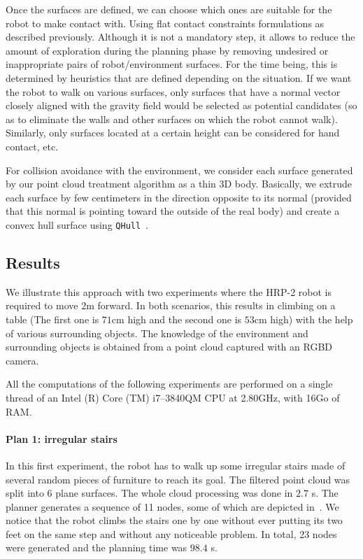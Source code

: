 Once the surfaces are defined, we can choose which ones are suitable for the robot to make contact with.
Using flat contact constraints formulations as described previously.
Although it is not a mandatory step, it allows to reduce the amount of exploration during the planning phase by removing undesired or inappropriate pairs of robot/environment surfaces.
For the time being, this is determined by heuristics that are defined depending on the situation.
If we want the robot to walk on various surfaces, only surfaces that have a normal vector closely aligned with the gravity field would be selected as potential candidates (so as to eliminate the walls and other surfaces on which the robot cannot walk).
Similarly, only surfaces located at a certain height can be considered for hand contact, etc.

For collision avoidance with the environment, we consider each surface generated by our point cloud treatment algorithm as a thin 3D body.
Basically, we extrude each surface by few centimeters in the direction opposite to its normal (provided that this normal is pointing toward the outside of the real body) and create a convex hull surface using {\tt QHull}~\cite{qhull:acm:1996}.

\subsection{Results}
\label{sub:results_pcl_plannif}

We illustrate this approach with two experiments where the HRP-2 robot is required to move $2$m forward.
In both scenarios, this results in climbing on a table (The first one is $71$cm high and the second one is $53$cm high) with the help of various surrounding objects.
The knowledge of the environment and surrounding objects is obtained from a point cloud captured with an RGBD camera.

All the computations of the following experiments are performed on a single thread of an Intel (R) Core (TM) i7--3840QM CPU at 2.80GHz, with 16Go of RAM\@.

\paragraph{Plan 1: irregular stairs}
In this first experiment, the robot has to walk up some irregular stairs made of several random pieces of furniture to reach its goal.
The filtered point cloud was split into 6 plane surfaces.
The whole cloud processing was done in $2.7$ s.
The planner generates a sequence of 11 nodes, some of which are depicted in~.
We notice that the robot climbs the stairs one by one without ever putting its two feet on the same step and without any noticeable problem.
In total, 23 nodes were generated and the planning time was $98.4$ s.

